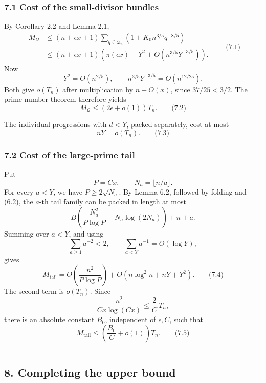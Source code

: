 \documentclass[
  11pt,
  a4paper,
]{article}
\begin{document}
\subsubsection{7.1 Cost of the small-divisor
bundles}\label{cost-of-the-small-divisor-bundles}

By Corollary 2.2 and Lemma 2.1, \begin{equation*}
\begin{aligned}
M_{\mathcal Q}
&\le
(n+\epsilon x+1)
\sum_{q\in\mathcal Q_n}
\left(1+K_0n^{3/5}q^{-8/5}\right)\\
&\le
(n+\epsilon x+1)
\left(
\pi(\epsilon x)+Y^2+
O\!\left(n^{3/5}Y^{-3/5}\right)
\right).
\end{aligned}
\qquad\text{(7.1)}
\end{equation*} Now \[
Y^2=O(n^{2/5}),
\qquad
n^{3/5}Y^{-3/5}=O(n^{12/25}).
\] Both give \(o(T_n)\) after multiplication by \(n+O(x)\), since
\(37/25<3/2\). The prime number theorem therefore yields \[
M_{\mathcal Q}\le(2\epsilon+o(1))T_n.
\qquad\text{(7.2)}
\]

The individual progressions with \(d<Y\), packed separately, cost at
most \[
nY=o(T_n).
\qquad\text{(7.3)}
\]

\subsubsection{7.2 Cost of the large-prime
tail}\label{cost-of-the-large-prime-tail}

Put \[
P=Cx,\qquad N_a=\lfloor n/a\rfloor.
\] For every \(a<Y\), we have \(P\ge2\sqrt{N_a}\). By Lemma 6.2,
followed by folding and (6.2), the \(a\)-th tail family can be packed in
length at most \[
B\left(
\frac{N_a^2}{P\log P}+N_a\log(2N_a)
\right)+n+a.
\] Summing over \(a<Y\), and using \[
\sum_{a\ge1}a^{-2}<2,
\qquad
\sum_{a<Y}a^{-1}=O(\log Y),
\] gives \[
M_{\mathrm{tail}}
=
O\!\left(\frac{n^2}{P\log P}\right)
+
O(n\log^2 n+nY+Y^2).
\qquad\text{(7.4)}
\] The second term is \(o(T_n)\). Since \[
\frac{n^2}{Cx\log(Cx)}
\le \frac2C\,T_n,
\] there is an absolute constant \(B_0\), independent of \(\epsilon,C\),
such that \[
M_{\mathrm{tail}}
\le
\left(\frac{B_0}{C}+o(1)\right)T_n.
\qquad\text{(7.5)}
\]

\begin{center}\rule{0.5\linewidth}{0.5pt}\end{center}

\subsection{8. Completing the upper
bound}\label{completing-the-upper-bound}
\end{document}
